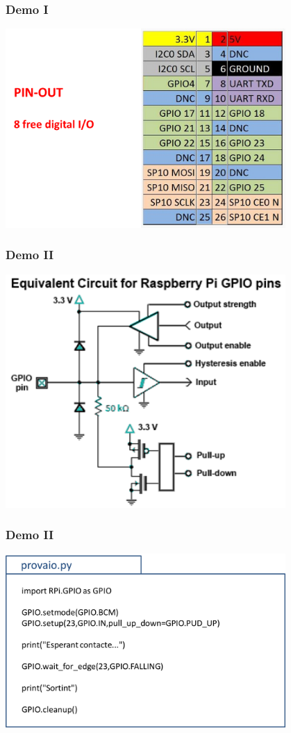 \documentclass[10pt,colorlinks]{beamer}
\begin{document}
\begin{frame}[fragile]\frametitle{Demo I}
\begin{center}
    \includegraphics[width=0.8\textwidth]{figs/pin1}
\end{center}
\end{frame}


\begin{frame}[fragile]\frametitle{Demo II}
\begin{center}
   \includegraphics[width=0.8\textwidth]{figs/pin2} 
\end{center}
\end{frame}
\begin{frame}[fragile]\frametitle{Demo II}
\begin{center}
   \includegraphics[width=0.8\textwidth]{figs/pin3}
\end{center}
\end{frame}
\end{document}
